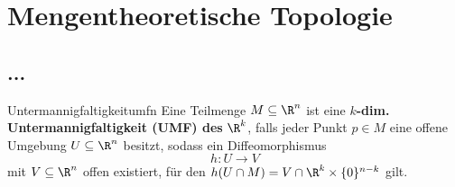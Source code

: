\section{Mengentheoretische Topologie}
\label{PST}
\subsection{...}
\label{subsec:Umfn}
\begin{definition}{Untermannigfaltigkeit}{umfn}
Eine Teilmenge $M \subseteq \R^n$ ist eine $k$\textbf{-dim. Untermannigfaltigkeit (UMF) des }$\R^k$, falls jeder Punkt $p \in M$ eine offene Umgebung $U \subseteq \R^n$ besitzt, sodass ein Diffeomorphismus
\begin{equation}
h: U \to V 
\end{equation}
mit $V \subseteq \R^n$ offen existiert, für den $h(U \cap M) = V \cap \R^k \times \{0\}^{n-k}$ gilt.
\end{definition}
